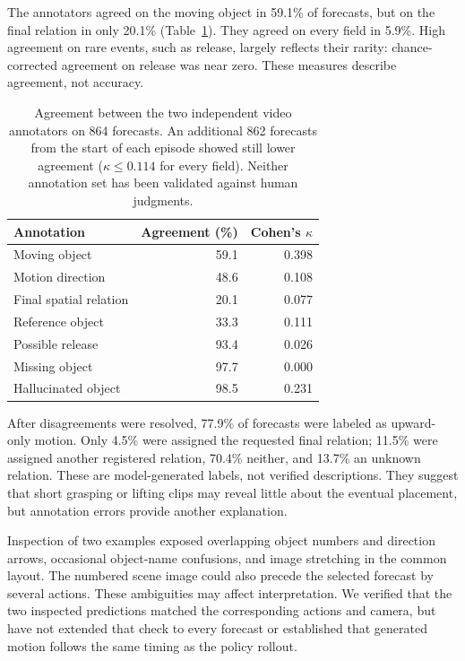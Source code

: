 \documentclass{article}
\begin{document}
The annotators agreed on the moving object in 59.1\% of forecasts, but on the final relation in only 20.1\% (Table~\ref{tab:forecast-agreement}). They agreed on every field in 5.9\%. High agreement on rare events, such as release, largely reflects their rarity: chance-corrected agreement on release was near zero. These measures describe agreement, not accuracy.

\begin{table}[htbp]
\centering
\small
\begin{tabular}{lrr}
\toprule
Annotation & Agreement (\%) & Cohen's $\kappa$ \\
\midrule
Moving object & 59.1 & 0.398 \\
Motion direction & 48.6 & 0.108 \\
Final spatial relation & 20.1 & 0.077 \\
Reference object & 33.3 & 0.111 \\
Possible release & 93.4 & 0.026 \\
Missing object & 97.7 & 0.000 \\
Hallucinated object & 98.5 & 0.231 \\
\bottomrule
\end{tabular}
\caption{Agreement between the two independent video annotators on 864 forecasts. An additional 862 forecasts from the start of each episode showed still lower agreement ($\kappa\leq0.114$ for every field). Neither annotation set has been validated against human judgments.}
\label{tab:forecast-agreement}
\end{table}

After disagreements were resolved, 77.9\% of forecasts were labeled as upward-only motion. Only 4.5\% were assigned the requested final relation; 11.5\% were assigned another registered relation, 70.4\% neither, and 13.7\% an unknown relation. These are model-generated labels, not verified descriptions. They suggest that short grasping or lifting clips may reveal little about the eventual placement, but annotation errors provide another explanation.

Inspection of two examples exposed overlapping object numbers and direction arrows, occasional object-name confusions, and image stretching in the common layout. The numbered scene image could also precede the selected forecast by several actions. These ambiguities may affect interpretation. We verified that the two inspected predictions matched the corresponding actions and camera, but have not extended that check to every forecast or established that generated motion follows the same timing as the policy rollout.
\end{document}
